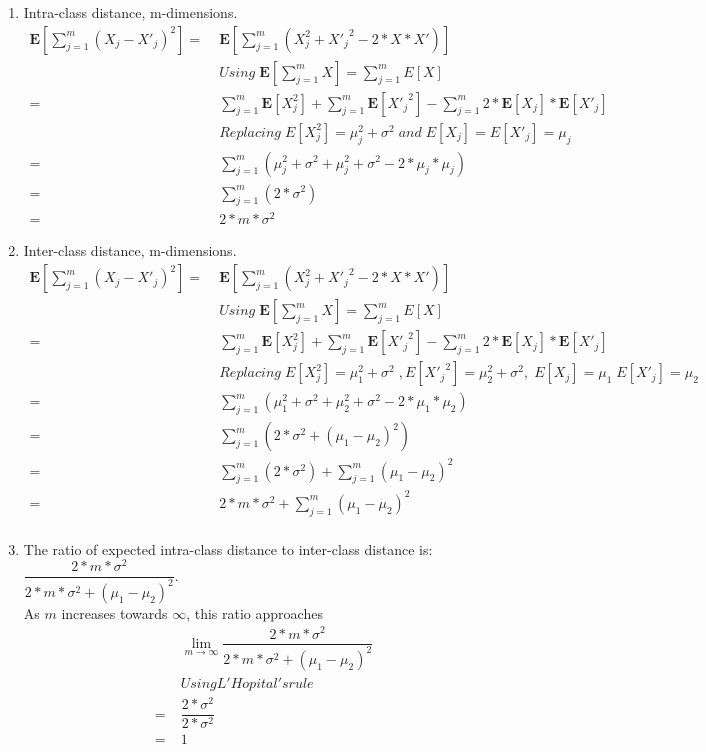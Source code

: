 \documentclass[english]{article}
\newcommand{\E}{\mathbf{E}}
\begin{document}
\begin{enumerate}
\item Intra-class distance, m-dimensions.
  \begin{align*}
    \E[\sum_{j=1}^m (X_{j} - X'_{j})^2] =&\;  \E[\sum_{j=1}^m  (X_{j}^{2} + {X'_{j}}^ {2}  - 2*X*X')]  \\
    &\; Using \; \E[\sum_{j=1}^m X] = \sum_{j=1}^m E[X] \\
    =&\; \sum_{j=1}^m \E[X_j^2] +  \sum_{j=1}^m \E[{X'_{j}}^2] -  \sum_{j=1}^m 2 * \E[X_j] * \E[X'_j] \\
    &\;  Replacing \; E[X_j^2] = \mu_j^2 + \sigma^2  \; and \; E[X_j] = E[X'_j] = \mu_j \\  
   =&\; \sum_{j=1}^m (\mu_j^2 + \sigma^2 + \mu_j^2 + \sigma^2 - 2 * \mu_j * \mu_j) \\
   =&\; \sum_{j=1}^m (2* \sigma^2) \\
   =&\; 2*m*\sigma^2
  \end{align*}

\item Inter-class distance, m-dimensions.
  \begin{align*}
     \E[\sum_{j=1}^m (X_{j} - X'_{j})^2] =&\;  \E[\sum_{j=1}^m  (X_{j}^{2} + {X'_{j}}^ {2}  - 2*X*X')]  \\
    &\; Using \; \E[\sum_{j=1}^m X] = \sum_{j=1}^m E[X] \\
    =&\; \sum_{j=1}^m \E[X_j^2] +  \sum_{j=1}^m \E[{X'_{j}}^2] -  \sum_{j=1}^m 2 * \E[X_j] * \E[X'_j] \\
    &\; Replacing \; E[X_j^2] = \mu_1^2 + \sigma^2  \; , E[{X'_{j}}^2] = \mu_2^2 + \sigma^2,\; E[X_j] = \mu_1 \; E[{X'_{j}}] = \mu_2 \;  \\ 
   =&\; \sum_{j=1}^m (\mu_1^2 + \sigma^2 + \mu_2^2 + \sigma^2 - 2 * \mu_1 * \mu_2) \\ 
   =&\; \sum_{j=1}^m ( 2 * \sigma^2 + (\mu_1 - \mu_2)^2) \\
   =&\; \sum_{j=1}^m (2 * \sigma^2) + \sum_{j=1}^m (\mu_1 - \mu_2)^2 \\
   =&\; 2 * m * \sigma^2 + \sum_{j=1}^m (\mu_1 - \mu_2)^2 \\
  \end{align*}

\item The ratio of expected intra-class distance to inter-class  distance is: $\dfrac{2*m*\sigma^2}{2*m*\sigma^2 + (\mu_1 - \mu_2)^2} $.  \\
  As $m$ increases towards $\infty$, this ratio approaches 
\begin{align*}
   &\; \lim_{m \to \infty} \dfrac{2*m*\sigma^2}{2*m*\sigma^2 + (\mu_1 - \mu_2)^2} \\
   &\; Using L'Hopital's rule \\
   =&\; \dfrac{2*\sigma^2}{2*\sigma^2} \\
   =&\; 1 
\end{align*}
\end{enumerate}
\end{document}
